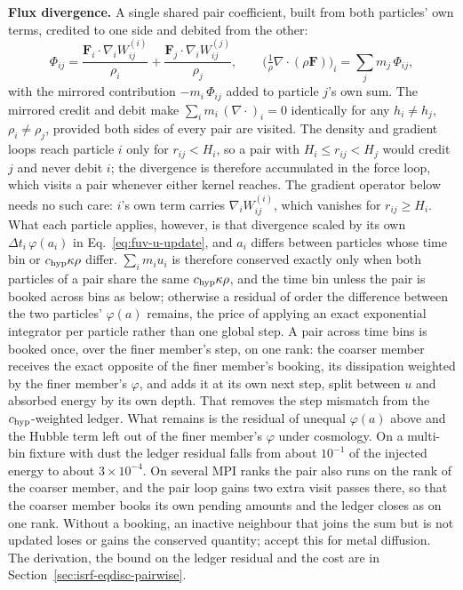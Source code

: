 \textbf{Flux divergence.} A single shared pair coefficient, built from
both particles' own terms, credited to one side and debited from the
other:
\begin{equation}
  \Phi_{ij} = \frac{\mathbf F_i\cdot\nabla_i W_{ij}^{(i)}}{\rho_i}
            + \frac{\mathbf F_j\cdot\nabla_i W_{ij}^{(j)}}{\rho_j} ,
  \qquad
  \Big(\tfrac{1}{\rho}\nabla\cdot(\rho\mathbf F)\Big)_i
    = \sum_j m_j\,\Phi_{ij} ,
  \label{eq:fuv-div-op}
\end{equation}
with the mirrored contribution $-m_i\,\Phi_{ij}$ added to particle
$j$'s own sum. The mirrored credit and debit make $\sum_i m_i\,(\nabla\cdot)_i = 0$
identically for any $h_i\ne h_j$, $\rho_i\ne\rho_j$, provided both sides
of every pair are visited. The density and gradient loops reach particle
$i$ only for $r_{ij} < H_i$, so a pair with $H_i \le r_{ij} < H_j$ would
credit $j$ and never debit $i$; the divergence is therefore accumulated
in the force loop, which visits a pair whenever either kernel reaches.
The gradient operator below needs no such care: $i$'s own term carries
$\nabla_i W_{ij}^{(i)}$, which vanishes for $r_{ij}\ge H_i$. What
each particle applies, however, is that divergence scaled by its own
$\Delta t_i\,\varphi(a_i)$ in Eq.~\ref{eq:fuv-u-update}, and $a_i$
differs between particles whose time bin or $c_{\rm hyp}\kappa\rho$
differ. $\sum_i m_i u_i$ is therefore conserved exactly only when both
particles of a pair share the same $c_{\rm hyp}\kappa\rho$, and the
time bin unless the pair is booked across bins as below; otherwise a residual of order the difference between
the two particles' $\varphi(a)$ remains, the price of applying an exact
exponential integrator per particle rather than one global step. A pair
across time bins is booked once, over the finer member's step, on one
rank: the coarser member receives the exact opposite of the finer
member's booking, its dissipation weighted by the finer member's
$\varphi$, and adds it at its own next step, split between $u$ and
absorbed energy by its own depth. That removes the step mismatch from
the $c_{\rm hyp}$-weighted ledger. What remains is the residual of
unequal $\varphi(a)$ above and the Hubble term left out of the finer
member's $\varphi$ under cosmology. On a multi-bin fixture with dust the
ledger residual falls from about $10^{-1}$ of the injected energy to
about $3\times10^{-4}$. On several MPI ranks the pair also runs on the
rank of the coarser member, and the pair loop gains two extra visit
passes there, so that the coarser member books its own pending amounts and
the ledger closes as on one rank. Without a booking, an inactive
neighbour that joins the sum but is not updated loses or gains the conserved
quantity; \citet{Correa2026} accept this for metal diffusion. The
derivation, the bound on the ledger residual and the cost are in
Section~\ref{sec:isrf-eqdisc-pairwise}.

